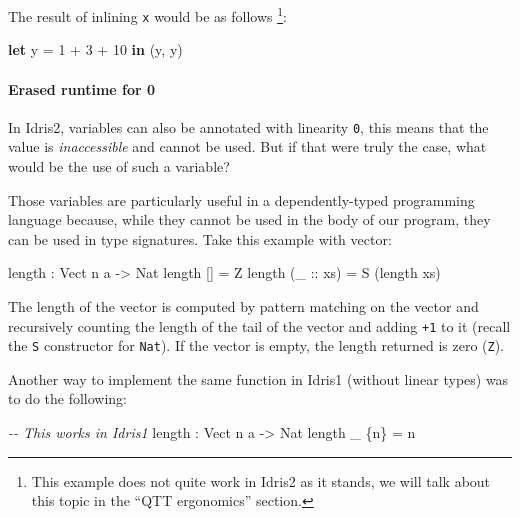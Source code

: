 \documentclass[
]{article}
\newenvironment{Shaded}{}{}
\newcommand{\CommentTok}[1]{\textcolor[rgb]{0.38,0.63,0.69}{\textit{#1}}}
\newcommand{\DataTypeTok}[1]{\textcolor[rgb]{0.56,0.13,0.00}{#1}}
\newcommand{\DecValTok}[1]{\textcolor[rgb]{0.25,0.63,0.44}{#1}}
\newcommand{\FunctionTok}[1]{\textcolor[rgb]{0.02,0.16,0.49}{#1}}
\newcommand{\KeywordTok}[1]{\textcolor[rgb]{0.00,0.44,0.13}{\textbf{#1}}}
\newcommand{\NormalTok}[1]{#1}
\newcommand{\OperatorTok}[1]{\textcolor[rgb]{0.40,0.40,0.40}{#1}}
\newcommand{\OtherTok}[1]{\textcolor[rgb]{0.00,0.44,0.13}{#1}}
\begin{document}
The result of inlining \texttt{x} would be as follows \footnote{This
  example does not quite work in Idris2 as it stands, we will talk about
  this topic in the ``QTT ergonomics'' section.}:

\begin{Shaded}
\begin{Highlighting}[]
\KeywordTok{let}\NormalTok{ y }\OtherTok{=} \DecValTok{1} \OperatorTok{+} \DecValTok{3} \OperatorTok{+} \DecValTok{10} \KeywordTok{in}
\NormalTok{    (y, y)}
\end{Highlighting}
\end{Shaded}

\hypertarget{erased-runtime-for-0}{%
\paragraph{Erased runtime for 0}\label{erased-runtime-for-0}}

In Idris2, variables can also be annotated with linearity \texttt{0},
this means that the value is \emph{inaccessible} and cannot be used. But
if that were truly the case, what would be the use of such a variable?

Those variables are particularly useful in a dependently-typed
programming language because, while they cannot be used in the body of
our program, they can be used in type signatures. Take this example with
vector:

\begin{Shaded}
\begin{Highlighting}[]
\FunctionTok{length} \OperatorTok{:} \DataTypeTok{Vect}\NormalTok{ n a }\OtherTok{{-}\textgreater{}} \DataTypeTok{Nat}
\FunctionTok{length}\NormalTok{ [] }\OtherTok{=} \DataTypeTok{Z}
\FunctionTok{length}\NormalTok{ (}\OtherTok{\_ ::}\NormalTok{ xs) }\OtherTok{=} \DataTypeTok{S}\NormalTok{ (}\FunctionTok{length}\NormalTok{ xs)}
\end{Highlighting}
\end{Shaded}

The length of the vector is computed by pattern matching on the vector
and recursively counting the length of the tail of the vector and adding
\texttt{+1} to it (recall the \texttt{S} constructor for \texttt{Nat}).
If the vector is empty, the length returned is zero (\texttt{Z}).

Another way to implement the same function in Idris1 (without linear
types) was to do the following:

\begin{Shaded}
\begin{Highlighting}[]
\CommentTok{{-}{-} This works in Idris1}
\FunctionTok{length} \OperatorTok{:} \DataTypeTok{Vect}\NormalTok{ n a }\OtherTok{{-}\textgreater{}} \DataTypeTok{Nat}
\FunctionTok{length}\NormalTok{ \_ \{n\} }\OtherTok{=}\NormalTok{ n}
\end{Highlighting}
\end{Shaded}
\end{document}
